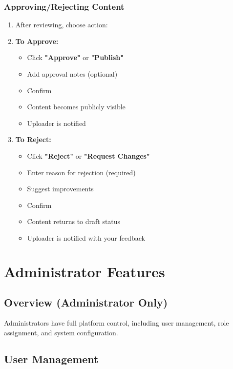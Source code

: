 \documentclass[12pt,a4paper]{article}
\begin{document}
\subsubsection{Approving/Rejecting Content}
\begin{enumerate}[leftmargin=*]
    \item After reviewing, choose action:
    \item \textbf{To Approve:}
        \begin{itemize}
            \item Click \textbf{"Approve"} or \textbf{"Publish"}
            \item Add approval notes (optional)
            \item Confirm
            \item Content becomes publicly visible
            \item Uploader is notified
        \end{itemize}
    \item \textbf{To Reject:}
        \begin{itemize}
            \item Click \textbf{"Reject"} or \textbf{"Request Changes"}
            \item Enter reason for rejection (required)
            \item Suggest improvements
            \item Confirm
            \item Content returns to draft status
            \item Uploader is notified with your feedback
        \end{itemize}
\end{enumerate}

\newpage

\section{Administrator Features}

\subsection{Overview (Administrator Only)}
Administrators have full platform control, including user management, role assignment, and system configuration.

\subsection{User Management}
\end{document}
